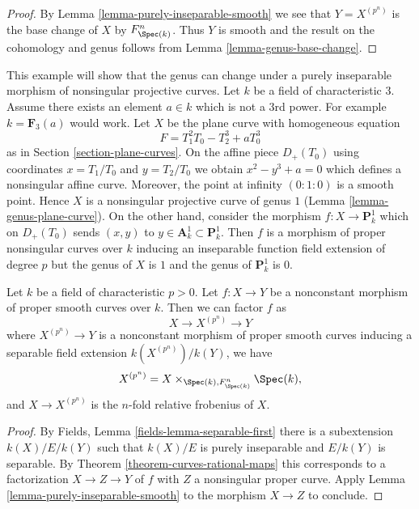 \begin{proof}
By Lemma \ref{lemma-purely-inseparable-smooth}
we see that $Y = X^{(p^n)}$ is the base change of
$X$ by $F_{\Spec(k)}^n$. Thus $Y$ is smooth and the result on the
cohomology and genus follows from
Lemma \ref{lemma-genus-base-change}.
\end{proof}

\begin{example}
\label{example-inseparable}
This example will show that the genus can change under a
purely inseparable morphism of nonsingular projective curves.
Let $k$ be a field of characteristic $3$. Assume there exists
an element $a \in k$ which is not a $3$rd power. For example
$k = \mathbf{F}_3(a)$ would work. Let $X$ be the plane curve
with homogeneous equation
$$
F = T_1^2T_0 - T_2^3 + aT_0^3
$$
as in Section \ref{section-plane-curves}.
On the affine piece $D_+(T_0)$ using coordinates $x = T_1/T_0$
and $y = T_2/T_0$ we obtain $x^2 - y^3 + a = 0$ which defines
a nonsingular affine curve. Moreover, the point at infinity
$(0 : 1: 0)$ is a smooth point. Hence $X$ is a nonsingular projective
curve of genus $1$ (Lemma \ref{lemma-genus-plane-curve}).
On the other hand, consider the morphism
$f : X \to \mathbf{P}^1_k$ which on $D_+(T_0)$ sends $(x, y)$ to
$y \in \mathbf{A}^1_k \subset \mathbf{P}^1_k$.
Then $f$ is a morphism of proper nonsingular curves over $k$
inducing an inseparable function field extension of degree $p$
but the genus of $X$ is $1$ and the genus of $\mathbf{P}^1_k$ is $0$.
\end{example}

\begin{proposition}
\label{proposition-unwind-morphism-smooth}
Let $k$ be a field of characteristic $p > 0$. Let $f : X \to Y$ be a
nonconstant morphism of proper smooth curves over $k$.
Then we can factor $f$ as
$$
X \longrightarrow X^{(p^n)} \longrightarrow Y
$$
where $X^{(p^n)} \to Y$ is a nonconstant morphism of proper smooth curves
inducing a separable field extension $k(X^{(p^n)})/k(Y)$, we have
$$
X^{(p^n)} = X \times_{\Spec(k), F_{\Spec(k)}^n} \Spec(k),
$$
and $X \to X^{(p^n)}$ is the $n$-fold relative frobenius of $X$.
\end{proposition}

\begin{proof}
By Fields, Lemma \ref{fields-lemma-separable-first}
there is a subextension $k(X)/E/k(Y)$ such that
$k(X)/E$ is purely inseparable and $E/k(Y)$ is separable.
By Theorem \ref{theorem-curves-rational-maps}
this corresponds to a factorization
$X \to Z \to Y$ of $f$ with $Z$ a nonsingular proper curve.
Apply Lemma \ref{lemma-purely-inseparable-smooth}
to the morphism $X \to Z$ to conclude.
\end{proof}

